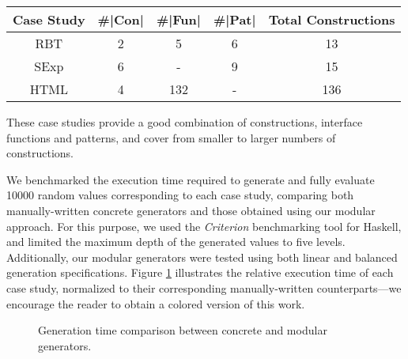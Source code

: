 \begin{table}[H]
  \begin{tabular}{||c||c||c||c||c||}
    \hline
    Case Study & \#|Con| & \#|Fun| & \#|Pat| & Total Constructions \\ \hline
    \hline
    RBT        & 2       & 5       & 6       & 13                  \\ \hline
    SExp       & 6       & -       & 9       & 15                  \\ \hline
    HTML       & 4       & 132     & -       & 136                 \\ \hline
  \end{tabular}
\end{table}

These case studies provide a good combination of constructions, interface
functions and patterns, and cover from smaller to larger numbers of
constructions.


We benchmarked the execution time required to generate and fully evaluate 10000
random values corresponding to each case study, comparing both manually-written
concrete generators and those obtained using our modular approach.
%
For this purpose, we used the \emph{Criterion} \cite{criterion} benchmarking
tool for Haskell, and limited the maximum depth of the generated values to five
levels.
%
Additionally, our modular generators were tested using both linear and balanced
generation specifications.
%
Figure \ref{fig:times} illustrates the relative execution time of each case
study, normalized to their corresponding manually-written counterparts---we
encourage the reader to obtain a colored version of this work.

\begin{figure}[t]
  \centering
  \caption{Generation time comparison between concrete and modular generators.}
  \label{fig:times}
\end{figure}

